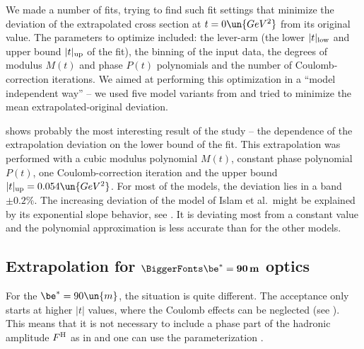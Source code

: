 
We made a number of fits, trying to find such fit settings that minimize the deviation of the extrapolated cross section at $t=0\un{GeV^2}$ from its original value. The parameters to optimize included: the lever-arm (the lower $|t|_{\rm low}$ and upper bound $|t|_{\rm up}$ of the fit), the binning of the input data, the degrees of modulus $M(t)$ and phase $P(t)$ polynomials and the number of Coulomb-correction iterations. We aimed at performing this optimization in a ``model independent way'' -- we used five model variants from  and tried to minimize the mean extrapolated-original deviation.


 shows probably the most interesting result of the study -- the dependence of the extrapolation deviation on the lower bound of the fit. This extrapolation was performed with a cubic modulus polynomial $M(t)$, constant phase polynomial $P(t)$, one Coulomb-correction iteration and the upper bound $|t|_{\rm up} = 0.054\un{GeV^2}$. For most of the models, the deviation lies in a band $\pm 0.2\percent$. The increasing deviation of the model of Islam et al.~might be explained by its exponential slope behavior, see . It is deviating most from a constant value and the polynomial approximation is less accurate than for the other models.




\def\OutlineLabel{Extrapolation for beta* = 90 m optics}
\def\TOCLabel{Extrapolation for $\be^* = 90$ m optics}
\subsection{Extrapolation for $\BiggerFonts\mathbf{\be^* = 90\,m}$ optics}

For the $\be^* = 90\un{m}$, the situation is quite different. The acceptance only starts at higher $|t|$ values, where the Coulomb effects can be neglected (see ). This means that it is not necessary to include a phase part of the hadronic amplitude $F^{\rm H}$ as in  and one can use the parameterization . 

